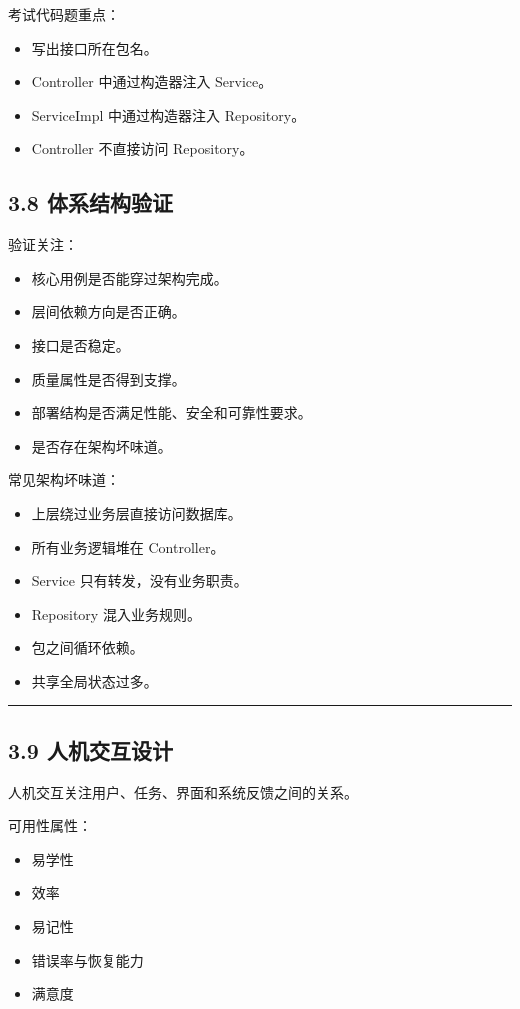 \documentclass[UTF8,zihao=-4]{ctexart}
\begin{document}
考试代码题重点：

\begin{itemize}
\item 写出接口所在包名。
\item Controller 中通过构造器注入 Service。
\item ServiceImpl 中通过构造器注入 Repository。
\item Controller 不直接访问 Repository。
\end{itemize}

\subsection{3.8 体系结构验证}

验证关注：

\begin{itemize}
\item 核心用例是否能穿过架构完成。
\item 层间依赖方向是否正确。
\item 接口是否稳定。
\item 质量属性是否得到支撑。
\item 部署结构是否满足性能、安全和可靠性要求。
\item 是否存在架构坏味道。
\end{itemize}

常见架构坏味道：

\begin{itemize}
\item 上层绕过业务层直接访问数据库。
\item 所有业务逻辑堆在 Controller。
\item Service 只有转发，没有业务职责。
\item Repository 混入业务规则。
\item 包之间循环依赖。
\item 共享全局状态过多。
\end{itemize}

\bigskip\hrule\bigskip

\subsection{3.9 人机交互设计}

人机交互关注用户、任务、界面和系统反馈之间的关系。

可用性属性：

\begin{itemize}
\item 易学性
\item 效率
\item 易记性
\item 错误率与恢复能力
\item 满意度
\end{itemize}
\end{document}
